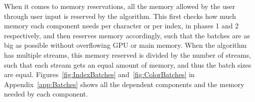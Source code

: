 When it comes to memory reservations, all the memory allowed by the user through user input is reserved by the algorithm.
This first checks how much memory each component needs per character or per index, in phases 1 and 2 respectively, and then reserves memory accordingly, such that the batches are as big as possible without overflowing GPU or main memory.
When the algorithm has multiple streams, this memory reserved is divided by the number of streams, such that each stream gets an equal amount of memory, and thus the batch sizes are equal.
Figures~\ref{fig:IndexBatches} and~\ref{fig:ColorBatches} in Appendix~\ref{app:Batches} shows all the dependent components and the memory needed by each component.
